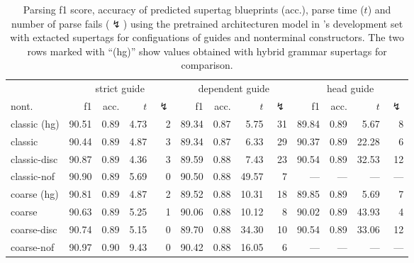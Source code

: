 \documentclass[../../document.tex]{subfiles}
\begin{document}
    \begin{table}
        \caption{\label{tbl:gridsearch:dcp:3}
        Parsing f1 score, accuracy of predicted supertag blueprints (acc.), parse time ($t$) and number of parse fails ($\lightning$) using the pretrained architecturen model in \negra{}'s development set with extacted  supertags for configuations of guides and nonterminal constructors. The two rows marked with ``(hg)'' show values obtained with hybrid grammar supertags for comparison.
        }
        \centering
        \setlength{\tabcolsep}{5pt}
        \vspace{.2cm}
        \begin{tabular}{l|rrrr|rrrr|rrrr}
            \toprule
            & \multicolumn{4}{c|}{strict guide} &  \multicolumn{4}{c|}{dependent guide} &  \multicolumn{4}{c}{head guide} \\
nont.           & f1 & acc. & $t$ & $\lightning$ & f1 & acc. & $t$ & $\lightning$ & f1 & acc. & $t$ & $\lightning$  \\ \hline
\rowcolor{black!10}
classic (hg) & 90.51 & 0.89 & 4.73 & 2 & 89.34 & 0.87 &  5.75 & 31 & 89.84 & 0.89 &  5.67 & 8 \\\hline
classic      & 90.44 & 0.89 & 4.87 & 3 & 89.34 & 0.87 &  6.33 & 29 & 90.37 & 0.89 & 22.28 & 6 \\
classic-disc & 90.87 & 0.89 & 4.36 & 3 & 89.59 & 0.88 &  7.43 & 23 & 90.54 & 0.89 & 32.53 & 12 \\
classic-nof  & 90.90 & 0.89 & 5.69 & 0 & 90.50 & 0.88 & 49.57 &  7 &   --- &  --- &   --- & --- \\ \hline
\rowcolor{black!10}
coarse (hg) & 90.81 & 0.89 & 4.87 & 2 & 89.52 & 0.88 & 10.31 & 18 & 89.85 & 0.89 &  5.69 & 7 \\ \hline
coarse      & 90.63 & 0.89 & 5.25 & 1 & 90.06 & 0.88 & 10.12 &  8 & 90.02 & 0.89 & 43.93 & 4 \\
coarse-disc & 90.74 & 0.89 & 5.15 & 0 & 89.70 & 0.88 & 34.30 & 10 & 90.54 & 0.89 & 33.06 & 12 \\
coarse-nof  & 90.97 & 0.90 & 9.43 & 0 & 90.42 & 0.88 & 16.05 &  6 &   --- &  --- &   --- & --- \\
\bottomrule
        \end{tabular}
    \end{table}
\end{document}
